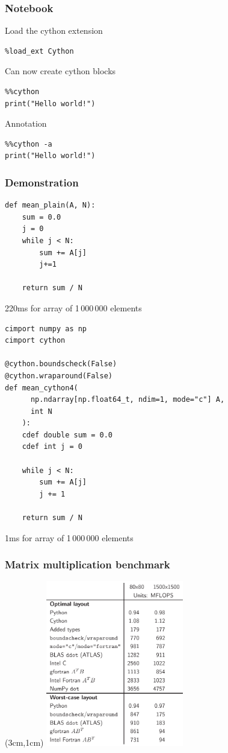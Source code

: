\documentclass[xcolor=pdftex,dvipsnames]{beamer}
\begin{document}
\begin{frame}[fragile]
  \frametitle{Notebook}
  Load the cython extension

  \begin{verbatim}
%load_ext Cython
  \end{verbatim}

  Can now create cython blocks
  \begin{verbatim}
%%cython
print("Hello world!")
  \end{verbatim}

  Annotation 
  \begin{verbatim}
%%cython -a
print("Hello world!")
  \end{verbatim}
\end{frame}


\begin{frame}[fragile]
  \frametitle{Demonstration}
\begin{verbatim}
def mean_plain(A, N):
    sum = 0.0
    j = 0
    while j < N:
        sum += A[j]
        j+=1

    return sum / N
\end{verbatim}
220ms for array of 1\,000\,000 elements
\end{frame}


\begin{frame}[fragile]
  \small
\begin{verbatim}
cimport numpy as np
cimport cython

@cython.boundscheck(False)
@cython.wraparound(False)
def mean_cython4(
      np.ndarray[np.float64_t, ndim=1, mode="c"] A,
      int N
    ):
    cdef double sum = 0.0
    cdef int j = 0

    while j < N:
        sum += A[j]  
        j += 1

    return sum / N
\end{verbatim}
1ms for array of 1\,000\,000 elements
\end{frame}


\begin{frame}
  \frametitle{Matrix multiplication benchmark}
  \begin{textblock*}{10cm}(3cm,1cm)
  \includegraphics[width=6cm]{benchmark}
  \end{textblock*}
\end{frame}
\end{document}
